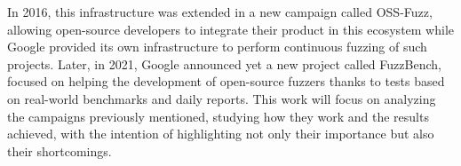\newline
In 2016, this infrastructure was extended in a new campaign called OSS-Fuzz, allowing open-source developers to integrate their product in this ecosystem while Google provided its own infrastructure to perform continuous fuzzing of such projects.
\newline
Later, in 2021, Google announced yet a new project called FuzzBench, focused on helping the development of open-source fuzzers thanks to tests based on real-world benchmarks and daily reports.
\newline \newline
This work will focus on analyzing the campaigns previously mentioned, studying how they work and the results achieved, with the intention of highlighting not only their importance but also their shortcomings.




\newpage
